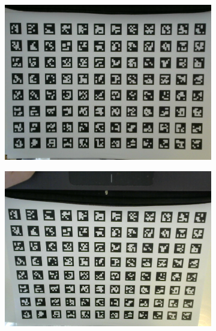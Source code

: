 \documentclass[../Head/report.tex]{subfiles}
\begin{document}
\begin{figure}[H]
    \centering
    \begin{subfigure}[t]{.22\textwidth}
        \centering
        \includegraphics[width=\textwidth]{../Figures/camera_calibration/1.png}
        \caption{}
        \label{fig:gazebo_gps2vision_board}
    \end{subfigure}
     \hspace{0.2em}
    \begin{subfigure}[t]{.22\textwidth}
        \centering
        \includegraphics[width=\textwidth]{../Figures//camera_calibration/3.png}
        \caption{}
        \label{fig:gazebo_landing_board_one}
    \end{subfigure}

\end{figure}
\end{document}
